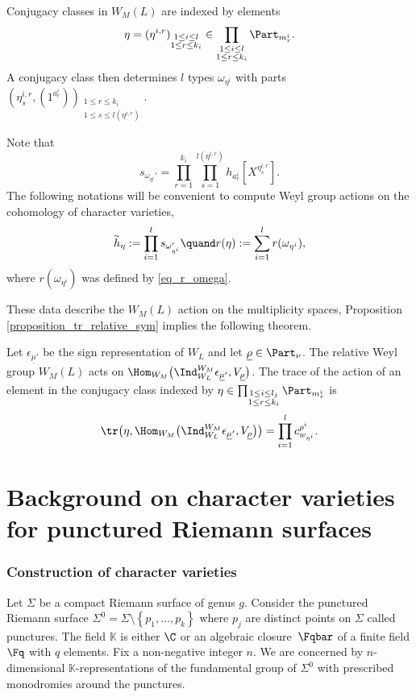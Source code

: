 \begin{notations}\label{notations_h_tilde}
Conjugacy classes in $W_M(L)$ are indexed by elements
\[
\eta=(\eta^{i,r})_{\substack{ 1 \le i \le l\\ 1 \le r \le k_{i}}} \in \prod_{\substack{ 1 \le i \le l \\ 1 \le r \le k_{i}}} \Part_{m^{i}_{r}}.
\]
A conjugacy class then determines $l$ types
$\omega_{\eta^i}$ with parts $(\eta^{i,r}_s,(1^{a^i_r}))_{\substack{ 1\le r \le k_i \\ 1\le s \le l(\eta^{i,r})}} $.

Note that
\[
s_{\omega_{\eta^i}'}= \prod_{r=1}^{k_i} \prod_{s=1}^{l(\eta^{i,r})} h_{a^i_r}[X^{\eta^{i,r}_s}].
\]
The following notations will be convenient to compute Weyl group actions on the cohomology of character varieties,
\[
\widetilde{h}_{\eta}:=\prod_{i=1}^l s_{\omega_{\eta^i}'}
\quand
r(\eta):=\sum_{i=1}^l r(\omega_{\eta^i}),
\]
where $r(\omega_{\eta^i})$ was defined by \eqref{eq_r_omega}.
\end{notations}

These data describe the $W_M(L)$ action on the multiplicity spaces, Proposition \ref{proposition_tr_relative_sym} implies the following theorem.
\begin{theorem}
Let $\epsilon_{\underline{\mu}'}$ be the sign representation of $W_L$ and let $\underline{\rho}\in\Part_{\nu}$. The relative Weyl group $W_M (L)$ acts on $\Hom_{W_M} \bigl(\Ind_{W_L}^{W_M} \epsilon_{\underline{\mu}'}, V_{\underline{\rho}}\bigr)$. The trace of the action of an element in the conjugacy class indexed by $\eta \in \prod_{\substack{ 1 \le i \le l_j \\ 1 \le r \le k_{i}}} \Part_{m^{i}_{r}}$ is
\[
\tr\bigl(\eta, \Hom_{W_M} \bigl(\Ind_{W_L}^{W_M} \epsilon_{\underline{\mu}'}, V_{\underline{\rho}}\bigr)\bigr) = \prod_{i=1}^{l} c^{\rho^i}_{w_{\eta^i}}.
\]
\end{theorem}

\section{Background on character varieties for punctured Riemann surfaces}\label{sect_background_char}

\subsubsection{Construction of character varieties}
Let $\Sigma$ be a compact Riemann surface of genus $g$. Consider the punctured Riemann surface $\Sigma^0=\Sigma\setminus\left\lbrace p_1,\dots,p_k\right\rbrace$ where $p_j$ are distinct points on $\Sigma$ called punctures. The field $\mathbb{K}$ is either $\C$ or an algebraic closure~$\Fqbar$ of a finite field $\Fq$ with $q$ elements. Fix a non-negative integer $n$. We are concerned by $n$-dimensional $\mathbb{K}$-representations of the fundamental group of $\Sigma^0$ with prescribed monodromies around the punctures.

